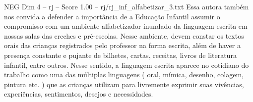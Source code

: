 \begin{textsample}{NEG Dim 4 – rj – Score 1.00 – rj/rj\_inf\_alfabetizar\_3.txt}
Essa autora também nos convida a defender a importância de a Educação Infantil assumir o compromisso com um ambiente alfabetizador inundado da linguagem escrita em nossas salas das creches e pré-escolas.
Nesse ambiente, devem constar os textos orais das crianças registrados pelo professor na forma escrita, além de haver a presença constante e pujante de bilhetes, cartas, receitas, livros de literatura infantil, entre outros.
Nesse sentido, a linguagem escrita aparece no cotidiano do trabalho como uma das múltiplas linguagens ( oral, mímica, desenho, colagem, pintura etc. ) que as crianças utilizam para livremente exprimir suas vivências, experiências, sentimentos, desejos e necessidades.

\end{textsample}
